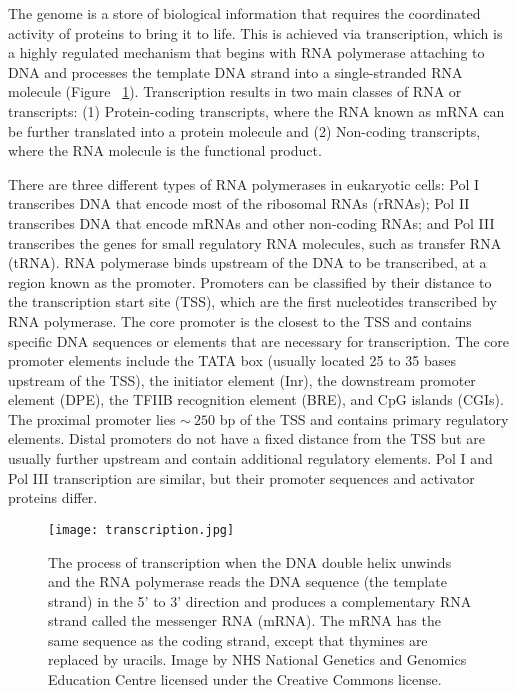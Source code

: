 The genome is a store of biological information that requires the coordinated activity of proteins to bring it to life. This is achieved via transcription, which is a highly regulated mechanism that begins with RNA polymerase attaching to DNA and processes the template DNA strand into a single-stranded RNA molecule (Figure ~\ref{fig:transcription}). Transcription results in two main classes of RNA or transcripts: (1) Protein-coding transcripts, where the RNA known as mRNA can be further translated into a protein molecule and (2) Non-coding transcripts, where the RNA molecule is the functional product.

There are three different types of RNA polymerases in eukaryotic cells: Pol I transcribes DNA that encode most of the ribosomal RNAs (rRNAs); Pol II transcribes DNA that encode mRNAs and other non-coding RNAs; and Pol III transcribes the genes for small regulatory RNA molecules, such as transfer RNA (tRNA). RNA polymerase binds upstream of the DNA to be transcribed, at a region known as the promoter. Promoters can be classified by their distance to the transcription start site (TSS), which are the first nucleotides transcribed by RNA polymerase. The core promoter is the closest to the TSS and contains specific DNA sequences or elements that are necessary for transcription. The core promoter elements include the TATA box (usually located 25 to 35 bases upstream of the TSS), the initiator element (Inr), the downstream promoter element (DPE), the TFIIB recognition element (BRE), and CpG islands (CGIs). The proximal promoter lies $\sim~250$ bp of the TSS and contains primary regulatory elements. Distal promoters do not have a fixed distance from the TSS but are usually further upstream and contain additional regulatory elements. Pol I and Pol III transcription are similar, but their promoter sequences and activator proteins differ.

\begin{figure}[!ht]
   \centering
   \texttt{[image: transcription.jpg]}
   \caption[DNA transcription]{The process of transcription when the DNA double helix unwinds and the RNA polymerase reads the DNA sequence (the template strand) in the 5' to 3' direction and produces a complementary RNA strand called the messenger RNA (mRNA). The mRNA has the same sequence as the coding strand, except that thymines are replaced by uracils. Image by NHS National Genetics and Genomics Education Centre licensed under the Creative Commons license.}
   \label{fig:transcription}
\end{figure}

